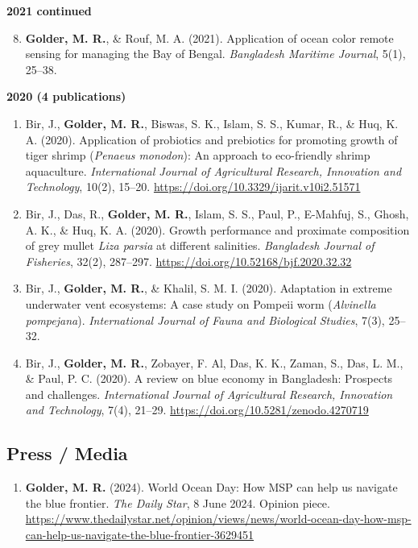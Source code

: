 \documentclass[11pt,a4paper,sans]{moderncv}
\begin{document}
\textbf{2021 continued}
\begin{enumerate}\setcounter{enumi}{7}
  \item \textbf{Golder, M. R.}, \& Rouf, M. A. (2021). Application of ocean color remote sensing for managing the Bay of Bengal. \textit{Bangladesh Maritime Journal}, 5(1), 25–38.
\end{enumerate}

\textbf{2020 (4 publications)}
\begin{enumerate}
  \item Bir, J., \textbf{Golder, M. R.}, Biswas, S. K., Islam, S. S., Kumar, R., \& Huq, K. A. (2020). Application of probiotics and prebiotics for promoting growth of tiger shrimp (\textit{Penaeus monodon}): An approach to eco-friendly shrimp aquaculture. \textit{International Journal of Agricultural Research, Innovation and Technology}, 10(2), 15–20. \url{https://doi.org/10.3329/ijarit.v10i2.51571}

  \item Bir, J., Das, R., \textbf{Golder, M. R.}, Islam, S. S., Paul, P., E-Mahfuj, S., Ghosh, A. K., \& Huq, K. A. (2020). Growth performance and proximate composition of grey mullet \textit{Liza parsia} at different salinities. \textit{Bangladesh Journal of Fisheries}, 32(2), 287–297. \url{https://doi.org/10.52168/bjf.2020.32.32}

  \item Bir, J., \textbf{Golder, M. R.}, \& Khalil, S. M. I. (2020). Adaptation in extreme underwater vent ecosystems: A case study on Pompeii worm (\textit{Alvinella pompejana}). \textit{International Journal of Fauna and Biological Studies}, 7(3), 25–32.

  \item Bir, J., \textbf{Golder, M. R.}, Zobayer, F. Al, Das, K. K., Zaman, S., Das, L. M., \& Paul, P. C. (2020). A review on blue economy in Bangladesh: Prospects and challenges. \textit{International Journal of Agricultural Research, Innovation and Technology}, 7(4), 21–29. \url{https://doi.org/10.5281/zenodo.4270719}
\end{enumerate}

\subsection{Press / Media}
\begin{enumerate}
  \item \textbf{Golder, M. R.} (2024). World Ocean Day: How MSP can help us navigate the blue frontier. \textit{The Daily Star}, 8 June 2024. Opinion piece. \url{https://www.thedailystar.net/opinion/views/news/world-ocean-day-how-msp-can-help-us-navigate-the-blue-frontier-3629451}
\end{enumerate}
\end{document}
